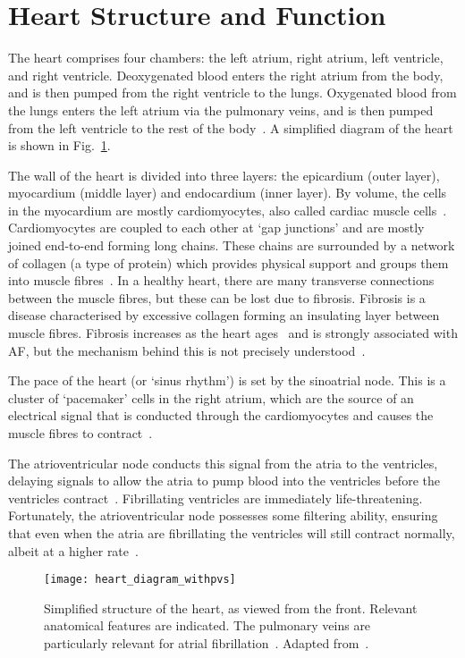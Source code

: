 \section{Heart Structure and Function}

The heart comprises four chambers: the left atrium, right atrium, left ventricle, and right ventricle. Deoxygenated blood enters the right atrium from the body, and is then pumped from the right ventricle to the lungs. Oxygenated blood from the lungs enters the left atrium via the pulmonary veins, and is then pumped from the left ventricle to the rest of the body~\cite{Weinhaus2005}. A simplified diagram of the heart is shown in Fig.~\ref{fig:heartdiagram}.

The wall of the heart is divided into three layers: the epicardium (outer layer), myocardium (middle layer) and endocardium (inner layer). By volume, the cells in the myocardium are mostly cardiomyocytes, also called cardiac muscle cells~\cite{clayton}. Cardiomyocytes are coupled to each other at `gap junctions' and are mostly joined end-to-end forming long chains. These chains are surrounded by a network of collagen (a type of protein) which provides physical support and groups them into muscle fibres~\cite{funck1997regulation}. In a healthy heart, there are many transverse connections between the muscle fibres, but these can be lost due to fibrosis. Fibrosis is a disease characterised by excessive collagen forming an insulating layer between muscle fibres. Fibrosis increases as the heart ages~\cite{luke1991remodeling} and is strongly associated with AF, but the mechanism behind this is not precisely understood~\cite{de2011fibrosis}.

The pace of the heart (or `sinus rhythm') is set by the sinoatrial node. This is a cluster of `pacemaker' cells in the right atrium, which are the source of an electrical signal that is conducted through the cardiomyocytes and causes the muscle fibres to contract~\cite{irisawa1993cardiac}.

The atrioventricular node conducts this signal from the atria to the ventricles, delaying signals to allow the atria to pump blood into the ventricles before the ventricles contract~\cite{campbell1997biology}. Fibrillating ventricles are immediately life-threatening. Fortunately, the atrioventricular node possesses some filtering ability, ensuring that even when the atria are fibrillating the ventricles will still contract normally, albeit at a higher rate~\cite{nattel}.

\begin{figure}[H] \begin{mdframed}
	\centering
	\texttt{[image: heart\_diagram\_withpvs]}
	\caption{Simplified structure of the heart, as viewed from the front. Relevant anatomical features are indicated. The pulmonary veins are particularly relevant for atrial fibrillation~\cite{haissaguerre1998spontaneous, ehrlich2003cellular}. Adapted from~\cite{gary2016bayes}.}
	\label{fig:heartdiagram}
\end{mdframed} \end{figure}


